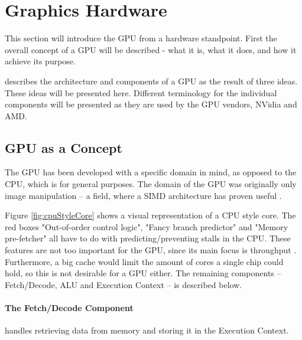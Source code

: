 \section{Graphics Hardware}\label{sec:graphics_hardware}


\begin{sectionmeta}
	
	This section will introduce the \gls{GPU} from a hardware standpoint. 
	First the overall concept of a \gls{GPU} will be described - what it is, what it does, and how it achieve its purpose.
	
	\cite{intro_to_gpu_arch} describes the architecture and components of a \gls{GPU} as the result of three ideas.
	These ideas will be presented here.
	Different terminology for the individual components will be presented as they are used by the \gls{GPU} vendors, NVidia and AMD. 
	
\end{sectionmeta}


\subsection{GPU as a Concept}
The \gls{GPU} has been developed with a specific domain in mind, as opposed to the CPU, which is for general purposes. 
The domain of the \gls{GPU} was originally only image manipulation -- a field, where a \gls{SIMD} architecture has proven useful .


Figure \ref{fig:cpuStyleCore} shows a visual representation of a \gls{CPU} style core. 
The red boxes "Out-of-order control logic", "Fancy branch predictor" and "Memory pre-fetcher" all have to do with predicting/preventing stalls in the \gls{CPU}.
These features are not too important for the \gls{GPU}, since its main focus is throughput . 
Furthermore, a big cache would limit the amount of cores a single chip could hold, so this is not desirable for a \gls{GPU} either.
The remaining components -- Fetch/Decode, \gls{ALU} and Execution Context -- is described below.

\paragraph{The Fetch/Decode Component} handles retrieving data from memory and storing it in the Execution Context.

